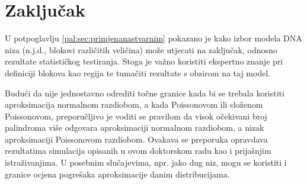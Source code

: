 \chapter{Zaključak}

U potpoglavlju \ref{pal:sec:primjenanastvarnim} pokazano je kako
izbor modela DNA niza (n.j.d., blokovi različitih veličina)
može utjecati na zaključak, odnosno rezultate statističkog testiranja.
Stoga je važno koristiti ekspertno znanje
pri definiciji blokova kao regija te tumačiti rezultate
s obzirom na taj model.

Budući da nije jednostavno odrediti točne granice kada bi
se trebala koristiti aproksimacija normalnom razdiobom,
a kada Poissonovom ili složenom Poissonovom,
preporučljivo je voditi se 
pravilom da visok očekivani broj palindroma
više odgovara aproksimaciji normalnom razdiobom,
a nizak aproksimaciji Poissonovom razdiobom.
Ovakava se preporuka opravdava rezultatima simulacija
opisanih u ovom doktorskom radu kao i prijašnjim istraživanjima.
U posebnim slučajevima, npr. jako dug niz, mogu se koristiti
i granice ocjena pogrešaka aproksimacije danim distribucijama.

